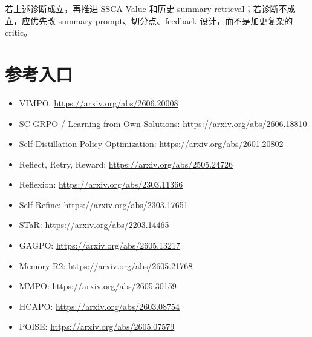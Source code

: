 \documentclass[10pt]{ctexart}
\begin{document}
若上述诊断成立，再推进 SSCA-Value 和历史 summary retrieval；若诊断不成立，应优先改 summary prompt、切分点、feedback 设计，而不是加更复杂的 critic。

\section{参考入口}
\begin{itemize}
  \item VIMPO: \url{https://arxiv.org/abs/2606.20008}
  \item SC-GRPO / Learning from Own Solutions: \url{https://arxiv.org/abs/2606.18810}
  \item Self-Distillation Policy Optimization: \url{https://arxiv.org/abs/2601.20802}
  \item Reflect, Retry, Reward: \url{https://arxiv.org/abs/2505.24726}
  \item Reflexion: \url{https://arxiv.org/abs/2303.11366}
  \item Self-Refine: \url{https://arxiv.org/abs/2303.17651}
  \item STaR: \url{https://arxiv.org/abs/2203.14465}
  \item GAGPO: \url{https://arxiv.org/abs/2605.13217}
  \item Memory-R2: \url{https://arxiv.org/abs/2605.21768}
  \item MMPO: \url{https://arxiv.org/abs/2605.30159}
  \item HCAPO: \url{https://arxiv.org/abs/2603.08754}
  \item POISE: \url{https://arxiv.org/abs/2605.07579}
\end{itemize}
\end{document}

